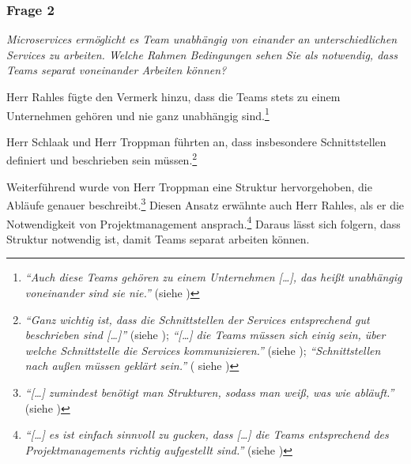 \subsubsection{Frage 2}

\textit{Microservices ermöglicht es Team unabhängig von einander an unterschiedlichen Services zu arbeiten. Welche Rahmen Bedingungen sehen Sie als notwendig, dass Teams separat voneinander Arbeiten können?}


Herr Rahles fügte den Vermerk hinzu, dass die Teams stets zu einem Unternehmen gehören und nie ganz unabhängig sind.\footnote{
\textit{\enquote{Auch diese Teams gehören zu einem Unternehmen […], das heißt unabhängig voneinander sind sie nie.}} (siehe )
}

Herr Schlaak und Herr Troppman führten an, dass insbesondere Schnittstellen definiert und beschrieben sein müssen.\footnote{
\textit{\enquote{Ganz wichtig ist, dass die Schnittstellen der Services entsprechend gut beschrieben sind […]}} (siehe ); \textit{\enquote{[…] die Teams müssen sich einig sein, über welche Schnittstelle die Services kommunizieren.}} (siehe ); \textit{\enquote{Schnittstellen nach außen müssen geklärt sein.}} ( siehe )
}

Weiterführend wurde von Herr Troppman eine Struktur hervorgehoben, die Abläufe genauer beschreibt.\footnote{
\textit{\enquote{[…] zumindest benötigt man Strukturen, sodass man weiß, was wie abläuft.}} (siehe )
} Diesen Ansatz erwähnte auch Herr Rahles, als er die Notwendigkeit von Projektmanagement ansprach.\footnote{
\textit{\enquote{[…] es ist einfach sinnvoll zu gucken, dass […] die Teams entsprechend des Projektmanagements richtig aufgestellt sind.}} (siehe )
} Daraus lässt sich folgern, dass Struktur notwendig ist, damit Teams separat arbeiten können.
